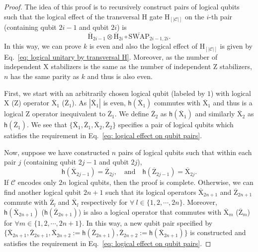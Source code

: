 \documentclass[reprint,aps,twocolumn,superscriptaddress,showpacs,notitlepage,10pt]{revtex4-2}
\theoremstyle{definition}
\begin{document}
\begin{proof}
    The idea of this proof is to recursively construct pairs of logical qubits such that the logical effect of the transversal H gate $\mathrm{H}_{[|\mathcal{C}|]}$ on the $i$-th pair (containing qubit $2i-1$ and qubit $2i$) is
    \begin{equation}\label{eq: logical effect on qubit pairs}
         \overline{\mathrm{H}}_{2i-1}\otimes \overline{\mathrm{H}}_{2i}\circ \overline{\mathrm{SWAP}}_{2i-1,2i}. 
    \end{equation}
   In this way, we can prove $k$ is even and also the logical effect of $\mathrm{H}_{[|\mathcal{C}|]}$ is given by Eq.~\ref{eq: logical unitary by transversal H}. Moreover, as the number of independent X stabilizers is the same as the number of independent Z stabilizers, $n$ has the same parity as $k$ and thus is also even. 

    First, we start with an arbitrarily chosen logical qubit (labeled by $1$) with logical $\mathrm{X}$ ($\mathrm{Z}$) operator $\overline{\mathrm{X}}_1$ ($\overline{\mathrm{Z}}_1$). As $|\overline{\mathrm{X}}_1|$ is even, $\mathsf{h}\left(\overline{\mathrm{X}}_1\right)$ commutes with $\overline{\mathrm{X}}_1$ and thus is a logical $\mathrm{Z}$ operator inequivalent to $\overline{\mathrm{Z}}_1$. We define $\overline{\mathrm{Z}}_2$ as $\mathsf{h}\left(\overline{\mathrm{X}}_1\right)$ and similarly $\overline{\mathrm{X}}_2$ as $\mathsf{h}\left(\overline{\mathrm{Z}}_1\right)$. We see that $\{\overline{\mathrm{X}}_1,\overline{\mathrm{Z}}_1,\overline{\mathrm{X}}_2,\overline{\mathrm{Z}}_2\}$ specifies a pair of logical qubits which satisfies the requirement in Eq.~\ref{eq: logical effect on qubit pairs}. 

    Now, suppose we have constructed $n$ pairs of logical qubits such that within each pair $j$ (containing qubit $2j-1$ and qubit $2j$), 
    \[
    \mathsf{h}(\overline{\mathrm{X}}_{2j-1}) = \overline{\mathrm{Z}}_{2j}, \quad \text{and}\quad \mathsf{h}(\overline{\mathrm{Z}}_{2j-1}) = \overline{\mathrm{X}}_{2j}.
    \]
    If $\mathcal{C}$ encodes only $2n$ logical qubits, then the proof is complete. Otherwise, we can find another logical qubit $2n+1$ such that its logical operators $\overline{\mathrm{X}}_{2n+1}$ and $\overline{\mathrm{Z}}_{2n+1}$ commute with $\overline{\mathrm{Z}}_{l}$ and $\overline{\mathrm{X}}_{l}$ respectively for $\forall\  l\in\{1,2,\cdots,2n\}$. Moreover, $\mathsf{h}\left(\overline{\mathrm{X}}_{2n+1}\right)$ ($\mathsf{h}\left(\overline{\mathrm{Z}}_{2n+1}\right)$) is also a logical operator that commutes with $\overline{\mathrm{X}}_{m}$ ($\overline{\mathrm{Z}}_{m}$) for $\forall m\in\{1,2,\cdots,2n+1\}$. In this way, a new qubit pair specified by $\{\overline{\mathrm{X}}_{2n+1},\overline{\mathrm{Z}}_{2n+1},\overline{\mathrm{X}}_{2n+2}:=\mathsf{h}\left(\overline{\mathrm{Z}}_{2n+1}\right),\overline{\mathrm{Z}}_{2n+2}:=\mathsf{h}\left(\overline{\mathrm{X}}_{2n+1}\right)\}$ is constructed and satisfies the requirement in Eq.~\ref{eq: logical effect on qubit pairs}. 
    
\end{proof}
\end{document}

